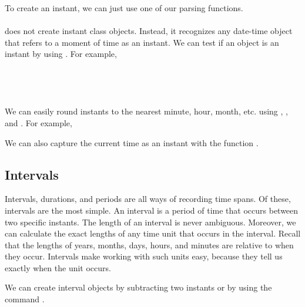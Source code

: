 \documentclass[article]{jss}
\begin{document}
To create an instant, we can just use one of our  parsing functions.\\ 

\\

 does not create instant class objects. Instead, it recognizes any date-time object that refers to a moment of time as an instant. We can test if an object is an instant by using . For example,\\

\\
\\

\\
\\

We can easily round instants to the nearest minute, hour, month, etc. using , , and . For example,


We can also capture the current time as an instant with the function .



\subsection{Intervals}
\label{sec:intervals}

Intervals, durations, and periods are all ways of recording time spans. Of these, intervals are the most simple. An interval is a period of time that occurs between two specific instants. The length of an interval is never ambiguous. Moreover, we can calculate the exact lengths of any time unit that occurs in the interval. Recall that the lengths of years, months, days, hours, and minutes are relative to when they occur. Intervals make working with such units easy, because they tell us exactly when the unit occurs. 

We can create interval objects by subtracting two instants or by using the command .\\

\\
\\
\\
\\
\end{document}
